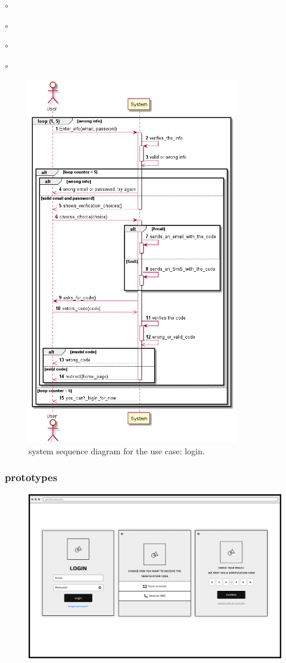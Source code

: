 \documentclass[]{uc2pfecaneva}
\begin{document}
\begin{list}{$\circ$}{}
\begin{list}{$\circ$}{}
\begin{list}{$\circ$}{}
\begin{list}{$\circ$}{}
\begin{figure}[h]
        \centering
        \includegraphics[width=260pt]{images/Login_dss}

        \caption{system sequence diagram for the use case: login.}
    \end{figure}
    \clearpage

    \subsubsection{prototypes}
    \begin{figure}[h]

        \centering
        \includegraphics[width=\textwidth]{images/login1}


\end{figure}
\end{list}
\end{list}
\end{list}
\end{list}
\end{document}
